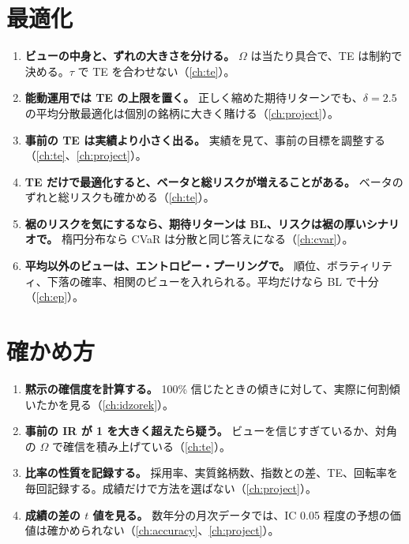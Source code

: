 \section{最適化}

\begin{enumerate}[label=\textbf{\arabic*.},leftmargin=2.2em,resume]
\item \textbf{ビューの中身と、ずれの大きさを分ける。} $\Omega$ は当たり具合で、TE は制約で決める。$\tau$ で TE を合わせない（\ref{ch:te}）。
\item \textbf{能動運用では TE の上限を置く。} 正しく縮めた期待リターンでも、$\delta=2.5$ の平均分散最適化は個別の銘柄に大きく賭ける（\ref{ch:project}）。
\item \textbf{事前の TE は実績より小さく出る。} 実績を見て、事前の目標を調整する（\ref{ch:te}、\ref{ch:project}）。
\item \textbf{TE だけで最適化すると、ベータと総リスクが増えることがある。} ベータのずれと総リスクも確かめる（\ref{ch:te}）。
\item \textbf{裾のリスクを気にするなら、期待リターンは BL、リスクは裾の厚いシナリオで。} 楕円分布なら CVaR は分散と同じ答えになる（\ref{ch:cvar}）。
\item \textbf{平均以外のビューは、エントロピー・プーリングで。} 順位、ボラティリティ、下落の確率、相関のビューを入れられる。平均だけなら BL で十分（\ref{ch:ep}）。
\end{enumerate}

\section{確かめ方}

\begin{enumerate}[label=\textbf{\arabic*.},leftmargin=2.2em,resume]
\item \textbf{黙示の確信度を計算する。} 100\% 信じたときの傾きに対して、実際に何割傾いたかを見る（\ref{ch:idzorek}）。
\item \textbf{事前の IR が 1 を大きく超えたら疑う。} ビューを信じすぎているか、対角の $\Omega$ で確信を積み上げている（\ref{ch:te}）。
\item \textbf{比率の性質を記録する。} 採用率、実質銘柄数、指数との差、TE、回転率を毎回記録する。成績だけで方法を選ばない（\ref{ch:project}）。
\item \textbf{成績の差の $t$ 値を見る。} 数年分の月次データでは、IC 0.05 程度の予想の価値は確かめられない（\ref{ch:accuracy}、\ref{ch:project}）。
\end{enumerate}
